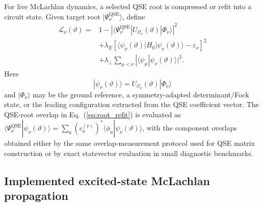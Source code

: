 \documentclass[
  reprint,
  amsmath,
  amssymb,
  aps,
  pra,
  nofootinbib,
  superscriptaddress,
  floatfix
]{revtex4-2}
\newcommand{\Oset}{\mathcal{O}}
\newcommand{\qse}{\mathrm{QSE}}
\newcommand{\ket}[1]{|#1\rangle}
\newcommand{\bra}[1]{\langle #1|}
\newcommand{\braket}[2]{\langle #1|#2\rangle}
\begin{document}
For live McLachlan dynamics, a selected QSE root is compressed or refit into a circuit state.  Given target root $\ket{\Psi_\nu^{\qse}}$, define
\begin{equation}
\begin{aligned}
\mathcal L_\nu(\vartheta)
={}&
1-
\left|
\bra{\Psi_\nu^{\qse}}
U_{\Oset_\nu}(\vartheta)\ket{\Phi_\nu}
\right|^2
\\
&+
\lambda_E
\left[
\bra{\psi_\nu(\vartheta)}H_0\ket{\psi_\nu(\vartheta)}
-\varepsilon_\nu
\right]^2
\\
&+
\lambda_\perp
\sum_{\mu<\nu}
|\braket{\psi_\mu}{\psi_\nu(\vartheta)}|^2 .
\end{aligned}
\label{eq:root_refit}
\end{equation}
Here
\begin{equation}
\ket{\psi_\nu(\vartheta)}=
U_{\Oset_\nu}(\vartheta)\ket{\Phi_\nu}
\label{eq:excited_live_ansatz}
\end{equation}
and $\ket{\Phi_\nu}$ may be the ground reference, a symmetry-adapted determinant/Fock state, or the leading configuration extracted from the QSE coefficient vector.
The QSE-root overlap in Eq.~(\ref{eq:root_refit}) is evaluated as
$\bra{\Psi_\nu^{\qse}}\psi_\nu(\vartheta)\rangle
=\sum_a(c_a^{(\nu)})^\ast\bra{\phi_a}\psi_\nu(\vartheta)\rangle$,
with the component overlaps obtained either by the same overlap-measurement protocol used for QSE matrix construction or by exact statevector evaluation in small diagnostic benchmarks.

\subsection{Implemented excited-state McLachlan propagation}
\end{document}
